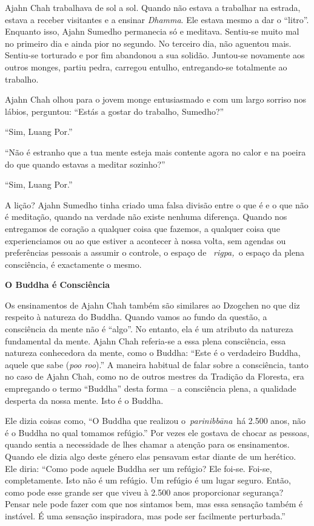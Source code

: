 Ajahn Chah trabalhava de sol a sol. Quando não estava a trabalhar na
estrada, estava a receber visitantes e a ensinar \emph{Dhamma}. Ele
estava mesmo a dar o ``litro''. Enquanto isso, Ajahn Sumedho permanecia
só e meditava. Sentiu-se muito mal no primeiro dia e ainda pior no
segundo. No terceiro dia, não aguentou mais. Sentiu-se torturado e por
fim abandonou a sua solidão. Juntou-se novamente aos outros monges,
partiu pedra, carregou entulho, entregando-se totalmente ao trabalho.~

Ajahn Chah olhou para o jovem monge entusiasmado e com um largo sorriso
nos lábios, perguntou: ``Estás a gostar do trabalho, Sumedho?''

``Sim, Luang Por.''

``Não é estranho que a tua mente esteja mais contente agora no calor e
na poeira do que quando estavas a meditar sozinho?''

``Sim, Luang Por.''

A lição? Ajahn Sumedho tinha criado uma falsa divisão entre o que é e o
que não é meditação, quando na verdade não existe nenhuma diferença.
Quando nos entregamos de coração a qualquer coisa que fazemos, a
qualquer coisa que experienciamos ou ao que estiver a acontecer à nossa
volta, sem agendas ou preferências pessoais a assumir o controle, o
espaço de ~\emph{rigpa,~}o espaço da plena consciência, é exactamente o
mesmo.

\textbf{O Buddha é Consciência}

Os ensinamentos de Ajahn Chah também são similares ao Dzogchen no que
diz respeito à natureza do Buddha. Quando vamos ao fundo da questão, a
consciência da mente não é ``algo''. No entanto, ela é um atributo da
natureza fundamental da mente. Ajahn Chah referia-se a essa plena
consciência, essa natureza conhecedora da mente, como o Buddha: ``Este é
o verdadeiro Buddha, aquele que sabe (\emph{poo roo}).'' A maneira
habitual de falar sobre a consciência, tanto no caso de Ajahn Chah, como
no de outros mestres da Tradição da Floresta, era empregando o termo
``Buddha'' desta forma -- a consciência plena, a qualidade desperta da
nossa mente. Isto é o Buddha.

Ele dizia coisas como, ``O Buddha que realizou o~\emph{parinibbāna}~há
2.500 anos, não é o Buddha no qual tomamos refúgio.'' Por vezes ele
gostava de chocar as pessoas, quando sentia a necessidade de lhes chamar
a atenção para os ensinamentos. Quando ele dizia algo deste género elas
pensavam estar diante de um herético. Ele diria: ``Como pode aquele
Buddha ser um refúgio? Ele foi-se. Foi-se, completamente. Isto não é um
refúgio. Um refúgio é um lugar seguro. Então, como pode esse grande ser
que viveu à 2.500 anos proporcionar segurança? Pensar nele pode fazer
com que nos sintamos bem, mas essa sensação também é instável. É uma
sensação inspiradora, mas pode ser facilmente perturbada.''

